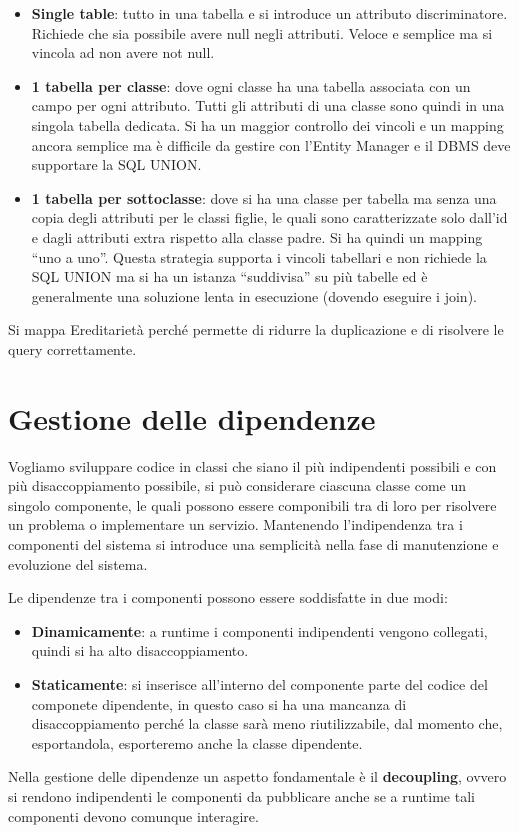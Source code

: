 \begin{itemize}
      \item \textbf{Single table}: tutto in una tabella e si introduce un attributo
            discriminatore. Richiede che sia possibile avere null negli attributi.
            Veloce e semplice ma si vincola ad non avere not null.
      \item \textbf{1 tabella per classe}: dove ogni classe ha una tabella
            associata con un campo per ogni attributo. Tutti gli attributi di una
            classe sono quindi in una singola tabella dedicata. Si ha un maggior
            controllo dei vincoli e un mapping ancora semplice ma è difficile
            da gestire con l'Entity Manager e il DBMS deve supportare la SQL
            UNION.
      \item \textbf{1 tabella per sottoclasse}: dove si ha una classe per tabella
            ma senza una copia degli attributi per le classi figlie, le quali sono
            caratterizzate solo dall'id e dagli attributi extra rispetto alla
            classe padre. Si ha quindi un mapping “uno a uno”. Questa strategia
            supporta i vincoli tabellari e non richiede la SQL UNION ma si ha un
            istanza “suddivisa” su più tabelle ed è generalmente una soluzione
            lenta in esecuzione (dovendo eseguire i join).
\end{itemize}
Si mappa Ereditarietà perché permette di ridurre la duplicazione e di risolvere
le query correttamente.
\section{Gestione delle dipendenze}
Vogliamo sviluppare codice in classi che siano il più indipendenti possibili e
con più disaccoppiamento possibile, si può considerare ciascuna classe come un
singolo componente, le quali possono essere componibili tra di loro per risolvere
un problema o implementare un servizio. Mantenendo l'indipendenza tra i componenti
del sistema si introduce una semplicità nella fase di manutenzione e evoluzione
del sistema.

Le dipendenze tra i componenti possono essere soddisfatte in due modi:
\begin{itemize}
      \item \textbf{Dinamicamente}: a runtime i componenti indipendenti vengono
            collegati, quindi si ha alto disaccoppiamento.
      \item \textbf{Staticamente}: si inserisce all'interno del componente parte
            del codice del componete dipendente, in questo caso si ha una mancanza
            di disaccoppiamento perché la classe sarà meno riutilizzabile, dal
            momento che, esportandola, esporteremo anche la classe dipendente.
\end{itemize}
Nella gestione delle dipendenze un aspetto fondamentale è il \textbf{decoupling},
ovvero si rendono indipendenti le componenti da pubblicare anche se a runtime tali
componenti devono comunque interagire.

